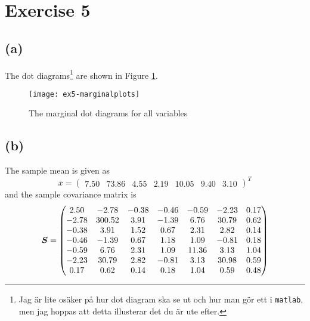 
\section*{Exercise 5}
\label{sec:exercise5}

\subsection*{(a)}
\label{sec:a-4}

The dot diagrams\footnote{Jag är lite osäker på hur dot diagram ska se
  ut och  hur man gör ett i \texttt{matlab}, men jag
  hoppas att detta illusterar det du är ute efter.} are shown in Figure \ref{fig:ex5-marginalplots}. 

\begin{figure}[h]
  \centering
  \texttt{[image: ex5-marginalplots]}
  \caption{The marginal dot diagrams for all variables}
  \label{fig:ex5-marginalplots}
\end{figure}

\subsection*{(b)}
\label{sec:b-4}

The sample mean is given as
\begin{equation*}
  \bar{x} =
  \begin{pmatrix}
    7.50 & 73.86 & 4.55 & 2.19 & 10.05 & 9.40 & 3.10 
  \end{pmatrix}^T
\end{equation*}
and the sample covariance matrix is
\begin{equation*}
  \bm{S} =
  \begin{pmatrix}
    2.50 & -2.78 & -0.38 & -0.46 & -0.59 & -2.23 & 0.17 \\ 
    -2.78 & 300.52 & 3.91 & -1.39 & 6.76 & 30.79 & 0.62 \\ 
    -0.38 & 3.91 & 1.52 & 0.67 & 2.31 & 2.82 & 0.14 \\ 
    -0.46 & -1.39 & 0.67 & 1.18 & 1.09 & -0.81 & 0.18 \\ 
    -0.59 & 6.76 & 2.31 & 1.09 & 11.36 & 3.13 & 1.04 \\ 
    -2.23 & 30.79 & 2.82 & -0.81 & 3.13 & 30.98 & 0.59 \\ 
    0.17 & 0.62 & 0.14 & 0.18 & 1.04 & 0.59 & 0.48 \\ 
  \end{pmatrix}
\end{equation*}


